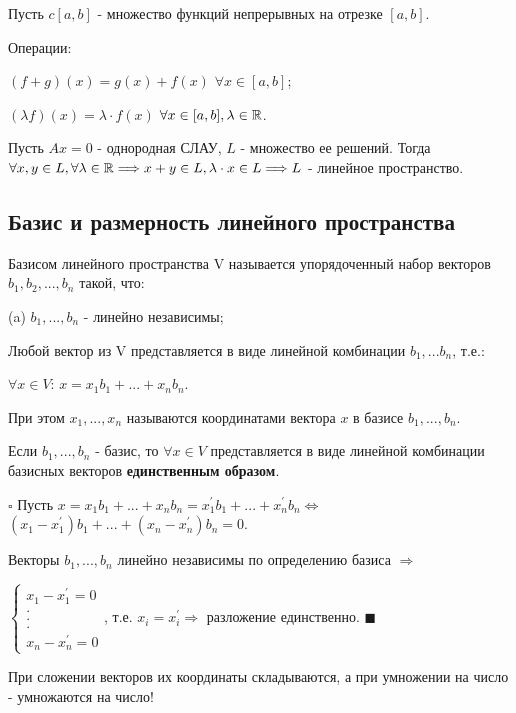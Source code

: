 \documentclass[../main.tex]{subfiles}
\begin{document}
\void{} Пусть $c[a, b]$ - множество функций непрерывных на отрезке $[a, b]$.

Операции:

$(f+g)(x) = g(x) + f(x)$ $\forall x\in [a, b]$;

$(\lambda f)(x) = \lambda\cdot f(x)$ $\forall x\in [a, b], \lambda\in \mathbb{R}$.

\void{} Пусть $Ax = 0$ - однородная СЛАУ, $L$ - множество ее решений. Тогда
$\forall x,y\in L, \forall\lambda\in\mathbb{R} \Longrightarrow x+y\in L, \lambda\cdot x\in L
\Longrightarrow L$ - линейное пространство.

\subsection{Базис и размерность линейного пространства}

\void{} Базисом линейного пространства V называется упорядоченный набор векторов
$b_1,b_2,...,b_n$ такой, что:

\void\numsec(a) $b_1,...,b_n$ - линейно независимы;

\void{} Любой вектор из V представляется в виде линейной комбинации $b_1,...b_n$, т.е.:

$\forall x\in V$: $x = x_1b_1 + ... + x_nb_n$.

При этом $x_1,...,x_n$ называются координатами вектора $x$ в базисе $b_1,...,b_n$.

\void{} Если $b_1,...,b_n$ - базис, то $\forall x\in V$ представляется в виде линейной комбинации
базисных векторов \textbf{единственным образом}.

\void
$\square$ Пусть $x = x_1b_1 + ... + x_nb_n = x^{'}_1b_1 + ... + x^{'}_nb_n \Longleftrightarrow$
$(x_1 - x^{'}_1)b_1 + ... + (x_n - x^{'}_n)b_n = 0$.

Векторы $b_1,...,b_n$ линейно независимы по определению базиса $\Rightarrow$

$\left\{
    \begin{matrix}
        x_1 - x^{'}_1 = 0\\
        .\\
        .\\
        .\\
        x_n - x^{'}_n = 0
    \end{matrix}
\right.$, т.е. $x_i = x^{'}_i \Longrightarrow$ разложение единственно. $\blacksquare$

\void{} При сложении векторов их координаты складываются, а при умножении на число -
умножаются на число!
\end{document}
